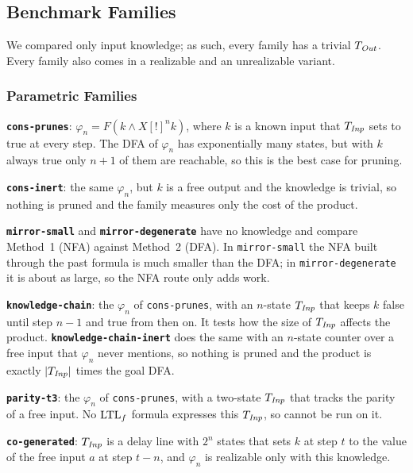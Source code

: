 \subsection{Benchmark Families}

We compared only input knowledge; as such, every family has a trivial $T_{\mathit{Out}}$.
Every family also comes in a realizable and an unrealizable variant.

\subsubsection{Parametric Families}

\textbf{\texttt{cons-prunes}}: $\varphi_n = F(k \wedge X[!]^n k)$, where $k$ is a known input that $T_{\mathit{Inp}}$ sets to true at every step.
The DFA of $\varphi_n$ has exponentially many states, but with $k$ always true only $n+1$ of them are reachable, so this is the best case for pruning.

\textbf{\texttt{cons-inert}}: the same $\varphi_n$, but $k$ is a free output and the knowledge is trivial, so nothing is pruned and the family measures only the cost of the product.

\textbf{\texttt{mirror-small}} and \textbf{\texttt{mirror-degenerate}} have no knowledge and compare Method~1 (NFA) against Method~2 (DFA).
In \texttt{mirror-small} the NFA built through the past formula is much smaller than the DFA; in \texttt{mirror-degenerate} it is about as large, so the NFA route only adds work.

\textbf{\texttt{knowledge-chain}}: the $\varphi_n$ of \texttt{cons-prunes}, with an $n$-state $T_{\mathit{Inp}}$ that keeps $k$ false until step $n-1$ and true from then on.
It tests how the size of $T_{\mathit{Inp}}$ affects the product.
\textbf{\texttt{knowledge-chain-inert}} does the same with an $n$-state counter over a free input that $\varphi_n$ never mentions, so nothing is pruned and the product is exactly $|T_{\mathit{Inp}}|$ times the goal DFA.

\textbf{\texttt{parity-t3}}: the $\varphi_n$ of \texttt{cons-prunes}, with a two-state $T_{\mathit{Inp}}$ that tracks the parity of a free input.
No $\text{LTL}_f$ formula expresses this $T_{\mathit{Inp}}$, so  cannot be run on it.

\textbf{\texttt{co-generated}}: $T_{\mathit{Inp}}$ is a delay line with $2^n$ states that sets $k$ at step $t$ to the value of the free input $a$ at step $t-n$, and $\varphi_n$ is realizable only with this knowledge.

